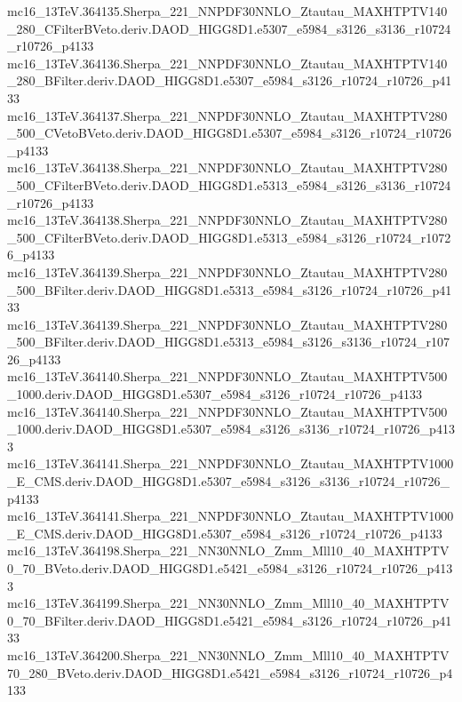 \begin{footnotesize}
mc16\_13TeV.364135.Sherpa\_221\_NNPDF30NNLO\_Ztautau\_MAXHTPTV140\_280\_CFilterBVeto.deriv.DAOD\_HIGG8D1.e5307\_e5984\_s3126\_s3136\_r10724\_r10726\_p4133 \\
mc16\_13TeV.364136.Sherpa\_221\_NNPDF30NNLO\_Ztautau\_MAXHTPTV140\_280\_BFilter.deriv.DAOD\_HIGG8D1.e5307\_e5984\_s3126\_r10724\_r10726\_p4133 \\
mc16\_13TeV.364137.Sherpa\_221\_NNPDF30NNLO\_Ztautau\_MAXHTPTV280\_500\_CVetoBVeto.deriv.DAOD\_HIGG8D1.e5307\_e5984\_s3126\_r10724\_r10726\_p4133 \\
mc16\_13TeV.364138.Sherpa\_221\_NNPDF30NNLO\_Ztautau\_MAXHTPTV280\_500\_CFilterBVeto.deriv.DAOD\_HIGG8D1.e5313\_e5984\_s3126\_s3136\_r10724\_r10726\_p4133 \\
mc16\_13TeV.364138.Sherpa\_221\_NNPDF30NNLO\_Ztautau\_MAXHTPTV280\_500\_CFilterBVeto.deriv.DAOD\_HIGG8D1.e5313\_e5984\_s3126\_r10724\_r10726\_p4133 \\
mc16\_13TeV.364139.Sherpa\_221\_NNPDF30NNLO\_Ztautau\_MAXHTPTV280\_500\_BFilter.deriv.DAOD\_HIGG8D1.e5313\_e5984\_s3126\_r10724\_r10726\_p4133 \\
mc16\_13TeV.364139.Sherpa\_221\_NNPDF30NNLO\_Ztautau\_MAXHTPTV280\_500\_BFilter.deriv.DAOD\_HIGG8D1.e5313\_e5984\_s3126\_s3136\_r10724\_r10726\_p4133 \\
mc16\_13TeV.364140.Sherpa\_221\_NNPDF30NNLO\_Ztautau\_MAXHTPTV500\_1000.deriv.DAOD\_HIGG8D1.e5307\_e5984\_s3126\_r10724\_r10726\_p4133 \\
mc16\_13TeV.364140.Sherpa\_221\_NNPDF30NNLO\_Ztautau\_MAXHTPTV500\_1000.deriv.DAOD\_HIGG8D1.e5307\_e5984\_s3126\_s3136\_r10724\_r10726\_p4133 \\
mc16\_13TeV.364141.Sherpa\_221\_NNPDF30NNLO\_Ztautau\_MAXHTPTV1000\_E\_CMS.deriv.DAOD\_HIGG8D1.e5307\_e5984\_s3126\_s3136\_r10724\_r10726\_p4133 \\
mc16\_13TeV.364141.Sherpa\_221\_NNPDF30NNLO\_Ztautau\_MAXHTPTV1000\_E\_CMS.deriv.DAOD\_HIGG8D1.e5307\_e5984\_s3126\_r10724\_r10726\_p4133 \\
mc16\_13TeV.364198.Sherpa\_221\_NN30NNLO\_Zmm\_Mll10\_40\_MAXHTPTV0\_70\_BVeto.deriv.DAOD\_HIGG8D1.e5421\_e5984\_s3126\_r10724\_r10726\_p4133 \\
mc16\_13TeV.364199.Sherpa\_221\_NN30NNLO\_Zmm\_Mll10\_40\_MAXHTPTV0\_70\_BFilter.deriv.DAOD\_HIGG8D1.e5421\_e5984\_s3126\_r10724\_r10726\_p4133 \\
mc16\_13TeV.364200.Sherpa\_221\_NN30NNLO\_Zmm\_Mll10\_40\_MAXHTPTV70\_280\_BVeto.deriv.DAOD\_HIGG8D1.e5421\_e5984\_s3126\_r10724\_r10726\_p4133 \\

\end{footnotesize}
